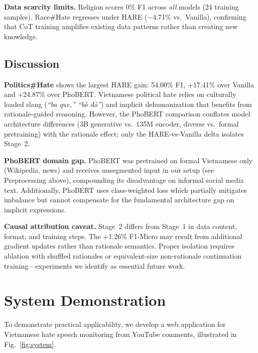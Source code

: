 \documentclass[conference]{IEEEtran}
\begin{document}
\textbf{Data scarcity limits.} Religion scores 0\% F1 across \textit{all} models
(24 training samples). Race\#Hate regresses under HARE ($-$4.71\% vs.\ Vanilla),
confirming that CoT training amplifies existing data patterns rather than
creating new knowledge.

\subsection{Discussion}

\textbf{Politics\#Hate} shows the largest HARE gain: 54.00\% F1, +17.41\% over
Vanilla and +24.87\% over PhoBERT. Vietnamese political hate relies on
culturally loaded slang (\foreignlanguage{vietnamese}{\textit{``ba que,''
``bò đỏ''}}) and implicit dehumanization that benefits from rationale-guided
reasoning. However, the PhoBERT comparison conflates model architecture
differences (3B generative vs.\ 135M encoder, diverse vs.\ formal pretraining)
with the rationale effect; only the HARE-vs-Vanilla delta isolates Stage~2.

\textbf{PhoBERT domain gap.} PhoBERT was pretrained on formal Vietnamese only
(Wikipedia, news) and receives unsegmented input in our setup (see Preprocessing
above), compounding its disadvantage on informal social media text. Additionally,
PhoBERT uses class-weighted loss which partially mitigates imbalance but cannot
compensate for the fundamental architecture gap on implicit expressions.

\textbf{Causal attribution caveat.} Stage~2 differs from Stage~1 in data
content, format, and training steps. The +1.26\% F1-Micro may result from
additional gradient updates rather than rationale semantics. Proper isolation
requires ablation with shuffled rationales or equivalent-size non-rationale
continuation training---experiments we identify as essential future work.


\section{System Demonstration}\label{sec:deployment}

To demonstrate practical applicability, we develop a web application for
Vietnamese hate speech monitoring from YouTube comments, illustrated in
Fig.~\ref{fig:system}.
\end{document}
